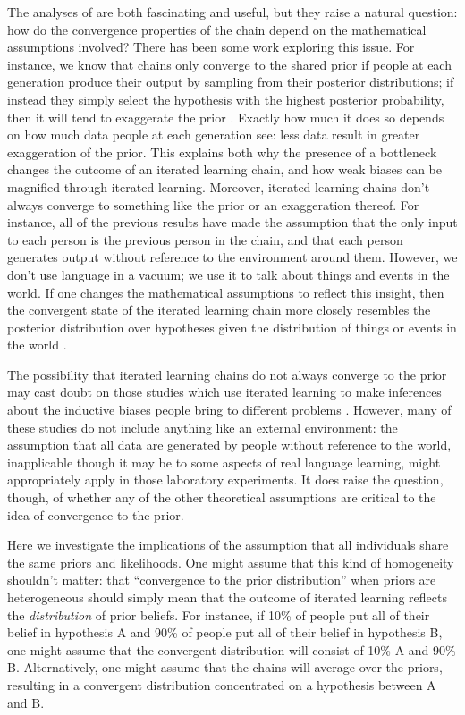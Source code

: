 \documentclass[doc]{apa6}
\begin{document}
The analyses of \textcite{griffiths_language_2007} are both fascinating and useful, but they raise a natural question: how do the convergence properties of the chain depend on the mathematical assumptions involved? There has been some work exploring this issue. For instance, we know that chains only converge to the shared prior if people at each generation produce their output by sampling from their posterior distributions; if instead they simply select the hypothesis with the highest posterior probability, then it will tend to exaggerate the prior \parencite{kirbyetal07}. Exactly how much it does so depends on how much data people at each generation see: less data result in greater exaggeration of the prior. This explains both why the presence of a bottleneck changes the outcome of an iterated learning chain, and how weak biases can be magnified through iterated learning. Moreover, iterated learning chains don't always converge to something like the prior or an exaggeration thereof. For instance, all of the previous results have made the assumption that the only input to each person is the previous person in the chain, and that each person generates output without reference to the environment around them. However, we don't use language in a vacuum; we use it to talk about things and events in the world. If one changes the mathematical assumptions to reflect this insight, then the convergent state of the iterated learning chain more closely resembles the posterior distribution over hypotheses given the distribution of things or events in the world \parencite{perforsnavarro14}.

The possibility that iterated learning chains do not always converge to the prior may cast doubt on those studies which use iterated learning to make inferences about the inductive biases people bring to different problems \parencite{kalish_iterated_2007,lewvul15,lewandowskyetal09,caninietal14}. However, many of these studies do not include anything like an external environment: the assumption that all data are generated by people without reference to the world, inapplicable though it may be to some aspects of real language learning, might appropriately apply in those laboratory experiments. It does raise the question, though, of whether any of the other theoretical assumptions are critical to the idea of convergence to the prior.

Here we investigate the implications of the assumption that all individuals share the same priors and likelihoods. One might assume that this kind of homogeneity shouldn't matter: that ``convergence to the prior distribution'' when priors are heterogeneous should simply mean that the outcome of iterated learning reflects the {\it distribution} of prior beliefs.  For instance, if 10\% of people put all of their belief in hypothesis A and 90\% of people put all of their belief in hypothesis B, one might assume that the convergent distribution will consist of 10\% A and 90\% B. Alternatively, one might assume that the chains will average over the priors, resulting in a convergent distribution concentrated on a hypothesis between A and B.
\end{document}
